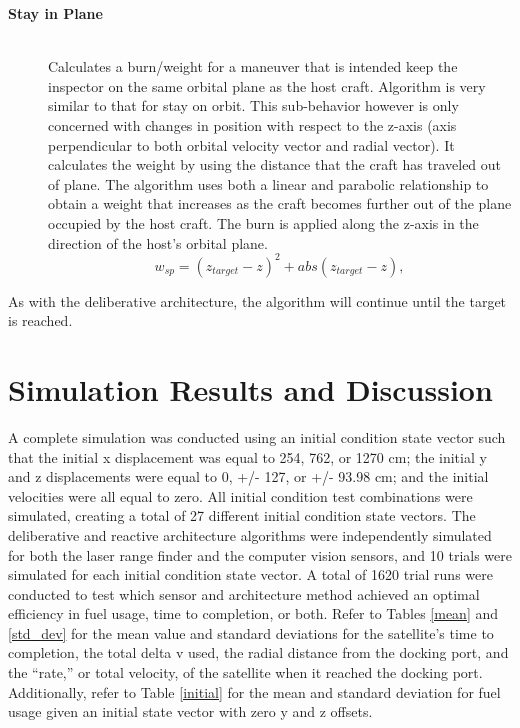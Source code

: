 \documentclass[journal, 10pt]{IEEEtran}
\begin{document}
\begin{description}
\item[\textbf{Stay in Plane}] \hfill \\
Calculates a burn/weight for a maneuver that is intended keep the inspector on the same orbital plane as the host craft.  Algorithm is very similar to that for stay on orbit.  This sub-behavior however is only concerned with changes in position with respect to the z-axis (axis perpendicular to both orbital velocity vector and radial vector).  It calculates the weight by using the distance that the craft has traveled out of plane.  The algorithm uses both a linear and parabolic relationship to obtain a weight that increases as the craft becomes further out of the plane occupied by the host craft.  The burn is applied along the z-axis in the direction of the host's orbital plane.
\begin{equation}
w_{sp} = (z_{target}-z)^2+abs(z_{target}-z),
\end{equation}

\end{description}

As with the deliberative architecture, the algorithm will continue until the target is reached.


\section{Simulation Results and Discussion} \label{discuss}
A complete simulation was conducted using an initial condition state vector such that the initial x displacement was equal to 254, 762, or 1270 cm; the initial y and z displacements were equal to 0, +/- 127, or +/- 93.98 cm; and the initial velocities were all equal to zero. All initial condition test combinations were simulated, creating a total of 27 different initial condition state vectors. The deliberative and reactive architecture algorithms were independently simulated for both the laser range finder and the computer vision sensors, and 10 trials were simulated for each initial condition state vector. A total of 1620 trial runs were conducted to test which sensor and architecture method achieved an optimal efficiency in fuel usage, time to completion, or both. Refer to Tables \ref{mean} and \ref{std_dev} for the mean value and standard deviations for the satellite's time to completion, the total delta v used, the radial distance from the docking port, and the ``rate,'' or total velocity, of the satellite when it reached the docking port. Additionally, refer to Table \ref{initial} for the mean and standard deviation for fuel usage given an initial state vector with zero y and z offsets. 
\end{document}
